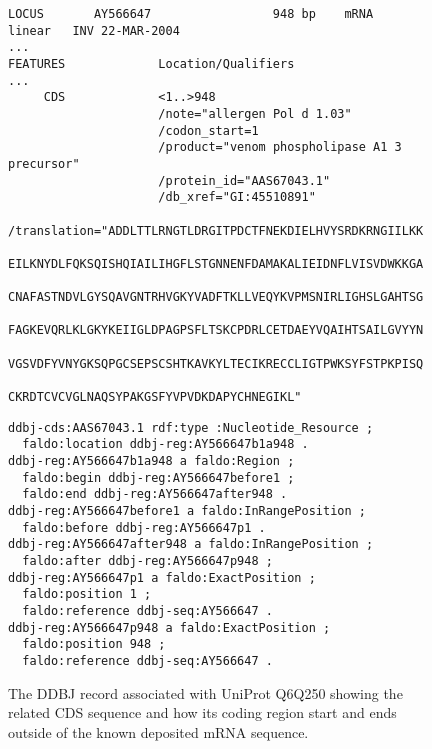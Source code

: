 \begin{figure}
\begin{shaded}
\begin{verbatim}
LOCUS       AY566647                 948 bp    mRNA    linear   INV 22-MAR-2004
...
FEATURES             Location/Qualifiers
...
     CDS             <1..>948
                     /note="allergen Pol d 1.03"
                     /codon_start=1
                     /product="venom phospholipase A1 3 precursor"
                     /protein_id="AAS67043.1"
                     /db_xref="GI:45510891"
                     /translation="ADDLTTLRNGTLDRGITPDCTFNEKDIELHVYSRDKRNGIILKK
                     EILKNYDLFQKSQISHQIAILIHGFLSTGNNENFDAMAKALIEIDNFLVISVDWKKGA
                     CNAFASTNDVLGYSQAVGNTRHVGKYVADFTKLLVEQYKVPMSNIRLIGHSLGAHTSG
                     FAGKEVQRLKLGKYKEIIGLDPAGPSFLTSKCPDRLCETDAEYVQAIHTSAILGVYYN
                     VGSVDFYVNYGKSQPGCSEPSCSHTKAVKYLTECIKRECCLIGTPWKSYFSTPKPISQ
                     CKRDTCVCVGLNAQSYPAKGSFYVPVDKDAPYCHNEGIKL"
\end{verbatim}
\begin{verbatim}
ddbj-cds:AAS67043.1 rdf:type :Nucleotide_Resource ;
  faldo:location ddbj-reg:AY566647b1a948 .
ddbj-reg:AY566647b1a948 a faldo:Region ;
  faldo:begin ddbj-reg:AY566647before1 ;
  faldo:end ddbj-reg:AY566647after948 .
ddbj-reg:AY566647before1 a faldo:InRangePosition ;
  faldo:before ddbj-reg:AY566647p1 .
ddbj-reg:AY566647after948 a faldo:InRangePosition ;
  faldo:after ddbj-reg:AY566647p948 ;
ddbj-reg:AY566647p1	a faldo:ExactPosition ;
  faldo:position 1 ;
  faldo:reference ddbj-seq:AY566647 .
ddbj-reg:AY566647p948 a faldo:ExactPosition ;
  faldo:position 948 ;
  faldo:reference ddbj-seq:AY566647 .
\end{verbatim}
\end{shaded}
\caption{The DDBJ record associated with UniProt Q6Q250 showing the related CDS sequence and how its coding region start and ends outside of the known deposited mRNA sequence.}
\label{fig:DDBJ}
\end{figure}



